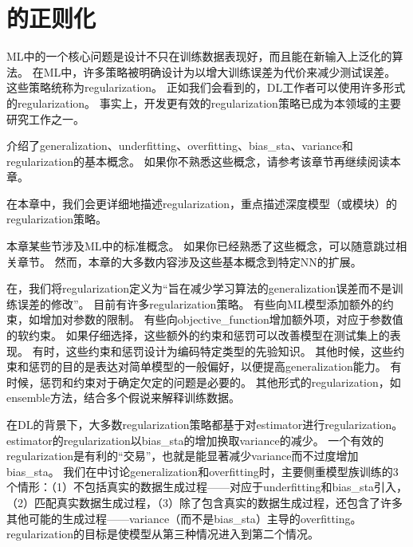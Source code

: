 \chapter{的正则化}
\label{chap:regularization_for_deep_learning}
\gls{ML}中的一个核心问题是设计不只在训练数据表现好，而且能在新输入上泛化的算法。
在\gls{ML}中，许多策略被明确设计为以增大训练误差为代价来减少测试误差。
这些策略统称为\gls{regularization}。
正如我们会看到的，\gls{DL}工作者可以使用许多形式的\gls{regularization}。
事实上，开发更有效的\gls{regularization}策略已成为本领域的主要研究工作之一。

介绍了\gls{generalization}、\gls{underfitting}、\gls{overfitting}、\gls{bias_sta}、\gls{variance}和\gls{regularization}的基本概念。
如果你不熟悉这些概念，请参考该章节再继续阅读本章。

在本章中，我们会更详细地描述\gls{regularization}，重点描述深度模型（或模块）的\gls{regularization}策略。

本章某些节涉及\gls{ML}中的标准概念。
如果你已经熟悉了这些概念，可以随意跳过相关章节。
然而，本章的大多数内容涉及这些基本概念到特定\gls{NN}的扩展。

在，我们将\gls{regularization}定义为``旨在减少学习算法的\gls{generalization}误差而不是训练误差的修改''。
目前有许多\gls{regularization}策略。
有些向\gls{ML}模型添加额外的约束，如增加对参数的限制。
有些向\gls{objective_function}增加额外项，对应于参数值的软约束。
如果仔细选择，这些额外的约束和惩罚可以改善模型在测试集上的表现。
有时，这些约束和惩罚设计为编码特定类型的先验知识。
其他时候，这些约束和惩罚的目的是表达对简单模型的一般偏好，以便提高\gls{generalization}能力。
有时候，惩罚和约束对于确定欠定的问题是必要的。
其他形式的\gls{regularization}，如\gls{ensemble}方法，结合多个假说来解释训练数据。


在\gls{DL}的背景下，大多数\gls{regularization}策略都基于对\gls{estimator}进行\gls{regularization}。
\gls{estimator}的\gls{regularization}以\gls{bias_sta}的增加换取\gls{variance}的减少。
一个有效的\gls{regularization}是有利的``交易''，也就是能显著减少\gls{variance}而不过度增加\gls{bias_sta}。
我们在中讨论\gls{generalization}和\gls{overfitting}时，主要侧重模型族训练的3个情形：（1）不包括真实的数据生成过程——对应于\gls{underfitting}和\gls{bias_sta}引入，（2）匹配真实数据生成过程，（3）除了包含真实的数据生成过程，还包含了许多其他可能的生成过程——\gls{variance}（而不是\gls{bias_sta}）主导的\gls{overfitting}。
\gls{regularization}的目标是使模型从第三种情况进入到第二个情况。

